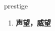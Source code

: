 
\begin{frame}
{\huge prestige}
\begin{center}
\begin{enumerate}\Large
  \item \textbf{声望，威望}
\end{enumerate}
\end{center}
\end{frame}
